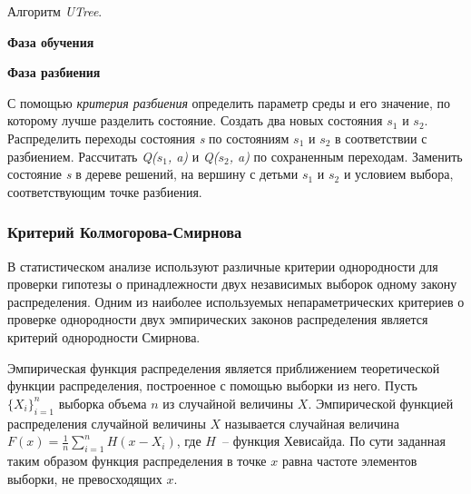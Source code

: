 \begin{algorithm}[h!]
    \caption{Алгоритм \textit{UTree}.}
    \label{utree_scheme}
    \textbf{Фаза обучения}
    \begin{algorithmic}[1]
    \end{algorithmic}
    \textbf{Фаза разбиения}
    \begin{algorithmic}[1]
            \ENDFOR
            \STATE С помощью \textit{критерия разбиения} определить параметр среды и его значение, по которому лучше разделить состояние.
                \STATE Создать два новых состояния $s_1$ и $s_2$.
                \STATE Распределить переходы состояния \textit{s} по состояниям $s_1$ и $s_2$ в соответствии с  разбиением.
                \STATE Рассчитать \textit{Q($s_1$, a)} и \textit{Q($s_2$, a)} по сохраненным переходам.
                \STATE Заменить состояние \textit{s} в дереве решений, на вершину с детьми $s_1$ и $s_2$ и условием выбора, соответствующим точке разбиения.
            \ENDIF
        \ENDFOR
    \end{algorithmic}
\end{algorithm}

\subsubsection{Критерий Колмогорова-Смирнова}
\label{ks_criteria}
В статистическом анализе используют различные критерии однородности для проверки гипотезы о принадлежности двух независимых выборок одному закону распределения. Одним из наиболее используемых непараметрических критериев о проверке однородности двух эмпирических законов распределения является критерий однородности Смирнова.

Эмпирическая функция распределения является приближением теоретической функции распределения, построенное с помощью выборки из него. Пусть $\{X_i\}_{i = 1}^n$ выборка объема $n$ из случайной величины $X$. Эмпирической функцией распределения случайной величины $X$ называется случайная величина $F(x) = \frac{1}{n}\sum\limits_{i = 1}^n{H(x - X_i)}$, где $H$~-- функция Хевисайда. По сути заданная таким образом функция распределения в точке $x$ равна частоте элементов выборки, не превосходящих $x$.

